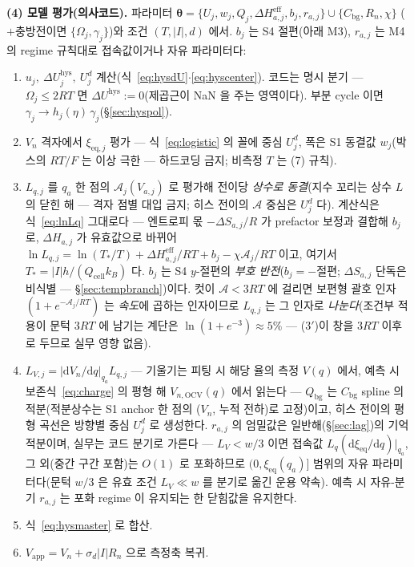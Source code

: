 \documentclass[11pt,a4paper]{article}
\newcommand{\dd}{\mathrm{d}}
\newcommand{\eff}{\mathrm{eff}}
\newcommand{\eq}{\mathrm{eq}}
\newcommand{\app}{\mathrm{app}}
\newcommand{\cell}{\mathrm{cell}}
\newcommand{\bg}{\mathrm{bg}}
\newcommand{\OCV}{\mathrm{OCV}}
\newcommand{\hys}{\mathrm{hys}}
\begin{document}
\textbf{(4) 모델 평가(의사코드).} 파라미터
$\bm\theta=\{U_j,w_j,Q_j,\Delta H_{a,j}^{\eff},b_j,r_{a,j}\}\cup\{C_\bg,R_n,\chi\}$
($+$충방전이면 $\{\Omega_j,\gamma_j\}$)와 조건 $(T,|I|,d)$ 에서. $b_j$ 는 S4 절편(아래 M3),
$r_{a,j}$ 는 M4 의 regime 규칙대로 접속값이거나 자유 파라미터다:
\begin{enumerate}[label=\textbf{M\arabic*.},leftmargin=2.4em,itemsep=1pt]
\item $u_j,\ \Delta U_j^\hys,\ U_j^d$ 계산(식~\eqref{eq:hysdU}$\cdot$\eqref{eq:hyscenter}).
  코드는 명시 분기 — $\Omega_j\le2RT$ 면 $\Delta U^\hys:=0$(제곱근이 NaN 을 주는 영역이다).
  부분 cycle 이면 $\gamma_j\to h_j(\eta)\,\gamma_j$(\S\ref{sec:hyspol}).
\item $V_n$ 격자에서 $\xi_{\eq,j}$ 평가 — 식~\eqref{eq:logistic} 의 꼴에 중심 $U_j^d$, 폭은
  S1 동결값 $w_j$(박스의 $RT/F$ 는 이상 극한 — 하드코딩 금지; 비측정 $T$ 는 (7) 규칙).
\item $L_{q,j}$ 를 $q_a$ 한 점의 $\mathcal A_j(V_{a,j})$ 로 평가해 전이당 \emph{상수로 동결}(지수
  꼬리는 상수 $L$ 의 닫힌 해 — 격자 점별 대입 금지; 히스 전이의 $\mathcal A$ 중심은 $U_j^d$ 다).
  계산식은 식~\eqref{eq:lnLq} 그대로다 — 엔트로피 몫 $-\Delta S_{a,j}/R$ 가 prefactor 보정과
  결합해 $b_j$ 로, $\Delta H_{a,j}$ 가 유효값으로 바뀌어
  $\ln L_{q,j}=\ln(T_*/T)+\Delta H_{a,j}^{\eff}/RT+b_j-\chi\mathcal A_j/RT$ 이고, 여기서
  $T_*=|I|h/(Q_\cell k_B)$ 다. $b_j$ 는 S4 $y$-절편의 \emph{부호 반전}($b_j=-$절편;
  $\Delta S_{a,j}$ 단독은 비식별 — \S\ref{sec:tempbranch})이다. 컷이 $\mathcal A<3RT$ 에 걸리면
  보편형 괄호 인자 $(1+e^{-\mathcal A_j/RT})$ 는 \emph{속도}에 곱하는 인자이므로 $L_{q,j}$ 는
  그 인자로 \emph{나눈다}(조건부 적용이 문턱 $3RT$ 에 남기는 계단은 $\ln(1+e^{-3})\approx5\%$ —
  (3$'$)이 창을 $3RT$ 이후로 두므로 실무 영향 없음).
\item $L_{V,j}=|\dd V_n/\dd q|_{q_a}L_{q,j}$ — 기울기는 피팅 시 해당 율의 측정 $V(q)$ 에서, 예측 시
  보존식~\eqref{eq:charge} 의 평형 해 $V_{n,\OCV}(q)$ 에서 읽는다 — $Q_\bg$ 는 $C_\bg$ spline 의
  적분(적분상수는 S1 anchor 한 점의 ($V_n$, 누적 전하)로 고정)이고, 히스 전이의 평형 곡선은 방향별
  중심 $U_j^d$ 로 생성한다. $r_{a,j}$ 의 엄밀값은 일반해(\S\ref{sec:lag})의 기억
  적분이며, 실무는 코드 분기로 가른다 — $L_V<w/3$ 이면 접속값 $L_{q}(\dd\xi_{\eq}/\dd q)|_{q_a}$,
  그 외(중간 구간 포함)는 $O(1)$ 로 포화하므로 $(0,\xi_{\eq}(q_a)]$ 범위의 자유 파라미터다(문턱
  $w/3$ 은 유효 조건 $L_V\ll w$ 를 분기로 옮긴 운용 약속). 예측 시 자유-분기 $r_{a,j}$ 는 포화
regime 이 유지되는 한 닫힘값을 유지한다.
\item 식~\eqref{eq:hysmaster} 로 합산.
\item $V_\app=V_n+\sigma_d|I|R_n$ 으로 측정축 복귀.
\end{enumerate}
\end{document}
